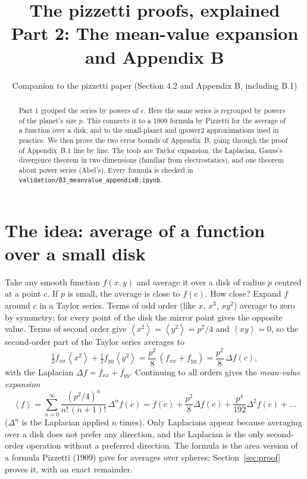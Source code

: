 \documentclass[11pt,a4paper]{article}
\title{The pizzetti proofs, explained\\[4pt]\large Part 2: The mean-value expansion and Appendix B}
\author{Companion to the pizzetti paper (Section 4.2 and Appendix B, including B.1)}
\date{}
\theoremstyle{remark}
\newcommand{\avg}[1]{\left\langle #1 \right\rangle}
\newcommand{\nb}[1]{\texttt{validation/#1}}
\begin{document}
\maketitle

\begin{abstract}
\noindent Part 1 grouped the series by powers of $\varepsilon$. Here the same series is regrouped
by powers of the planet's size $p$. This connects it to a 1909 formula by Pizzetti for the
average of a function over a disk, and to the small-planet and qpower2 approximations used in
practice. We then prove the two error bounds of Appendix~B, going through the proof of
Appendix~B.1 line by line. The tools are Taylor expansion, the Laplacian, Gauss's divergence
theorem in two dimensions (familiar from electrostatics), and one theorem about power series
(Abel's). Every formula is checked in \nb{03\_meanvalue\_appendixB.ipynb}.
\end{abstract}

\tableofcontents

\section{The idea: average of a function over a small disk}

Take any smooth function $f(x,y)$ and average it over a disk of radius $p$ centred at a point $c$.
If $p$ is small, the average is close to $f(c)$. How close? Expand $f$ around $c$ in a Taylor
series. Terms of odd order (like $x$, $x^3$, $xy^2$) average to zero by symmetry: for every point
of the disk the mirror point gives the opposite value. Terms of second order give
$\avg{x^2}=\avg{y^2}=p^2/4$ and $\avg{xy}=0$, so the second-order part of the Taylor series averages
to
\[
  \tfrac12 f_{xx}\avg{x^2}+\tfrac12 f_{yy}\avg{y^2}=\frac{p^2}{8}\,(f_{xx}+f_{yy})=\frac{p^2}{8}\,\Delta f(c),
\]
with the Laplacian $\Delta f=f_{xx}+f_{yy}$. Continuing to all orders gives the
\emph{mean-value expansion}
\begin{equation}
  \avg{f}=\sum_{n=0}^\infty\frac{(p^2/4)^n}{n!\,(n+1)!}\,\Delta^nf(c)
  =f(c)+\frac{p^2}{8}\Delta f(c)+\frac{p^4}{192}\Delta^2f(c)+\dots
  \label{eq:mv}
\end{equation}
($\Delta^n$ is the Laplacian applied $n$ times). Only Laplacians appear because averaging over a
disk does not prefer any direction, and the Laplacian is the only second-order operation without
a preferred direction. The formula is the area version of a formula Pizzetti (1909) gave for
averages over spheres; Section~\ref{sec:proof} proves it, with an exact remainder.
\end{document}
